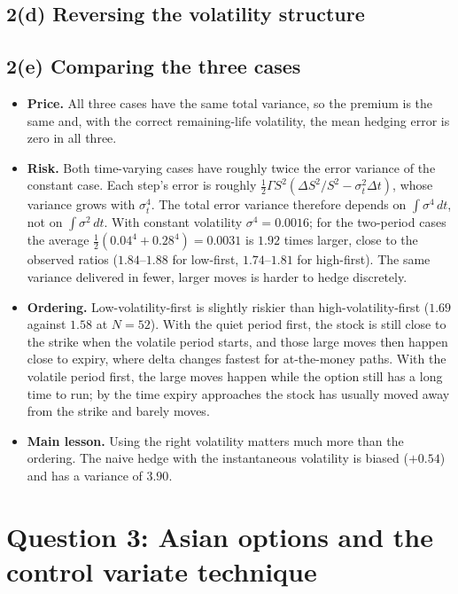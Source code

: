 \documentclass[11pt,a4paper]{article}
\newcommand{\restab}[3]{%
  \begin{table}[H]\centering\footnotesize
  \caption{#2}\label{#3}
  
  \end{table}}
\begin{document}
\subsection*{2(d) Reversing the volatility structure}
\restab{q2_reversed}{Hedging error when the high-volatility period comes first
(28\% then 4\%), 10,000 paths.}{tab:q2-reversed}

\subsection*{2(e) Comparing the three cases}
\begin{itemize}[leftmargin=*]
\item \textbf{Price.} All three cases have the same total variance, so the
  premium is the same and, with the correct remaining-life volatility, the
  mean hedging error is zero in all three.
\item \textbf{Risk.} Both time-varying cases have roughly twice the error
  variance of the constant case. Each step's error is roughly
  $\tfrac12\Gamma S^2(\Delta S^2/S^2-\sigma_t^2\Delta t)$, whose variance
  grows with $\sigma_t^4$. The total error variance therefore depends on
  $\int\sigma^4\,dt$, not on $\int\sigma^2\,dt$. With constant volatility
  $\sigma^4=0.0016$; for the two-period cases the average
  $\tfrac12(0.04^4+0.28^4)=0.0031$ is $1.92$ times larger, close to the
  observed ratios ($1.84$--$1.88$ for low-first, $1.74$--$1.81$ for
  high-first). The same variance delivered in fewer, larger moves is harder
  to hedge discretely.
\item \textbf{Ordering.} Low-volatility-first is slightly riskier than
  high-volatility-first ($1.69$ against $1.58$ at $N=52$). With the quiet
  period first, the stock is still close to the strike when the volatile
  period starts, and those large moves then happen close to expiry, where
  delta changes fastest for at-the-money paths. With the volatile period
  first, the large moves happen while the option still has a long time to
  run; by the time expiry approaches the stock has usually moved away from
  the strike and barely moves.
\item \textbf{Main lesson.} Using the right volatility matters much more
  than the ordering. The naive hedge with the instantaneous volatility is
  biased ($+0.54$) and has a variance of $3.90$.
\end{itemize}

\section*{Question 3: Asian options and the control variate technique}
\end{document}
